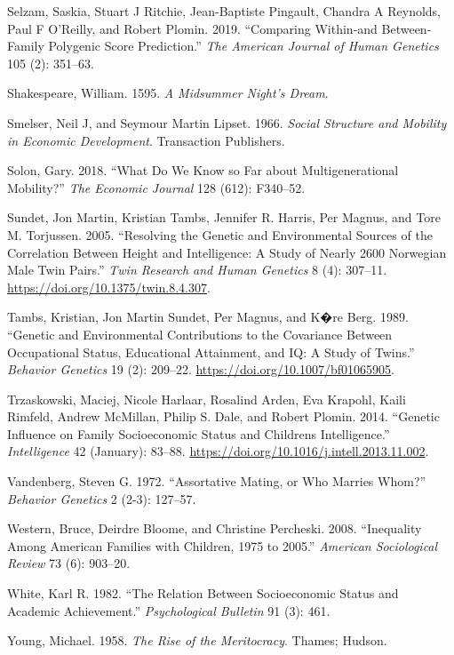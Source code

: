 \documentclass[
]{article}
\newlength{\cslhangindent}
\newlength{\cslentryspacingunit} %
\newenvironment{CSLReferences}[2] %
 {%
  \setlength{\parindent}{0pt}
  \ifodd #1
  \let\oldpar\par
  \def\par{\hangindent=\cslhangindent\oldpar}
  \fi
  \setlength{\parskip}{#2\cslentryspacingunit}
 }%
 {}
\theoremstyle{definition}
\theoremstyle{definition}
\theoremstyle{definition}
\theoremstyle{definition}
\theoremstyle{remark}
\begin{document}
\begin{CSLReferences}{1}{0}
\leavevmode{}%
Selzam, Saskia, Stuart J Ritchie, Jean-Baptiste Pingault, Chandra A Reynolds, Paul F O'Reilly, and Robert Plomin. 2019. {``Comparing Within-and Between-Family Polygenic Score Prediction.''} \emph{The American Journal of Human Genetics} 105 (2): 351--63.

\leavevmode{}%
Shakespeare, William. 1595. \emph{A Midsummer Night's Dream}.

\leavevmode{}%
Smelser, Neil J, and Seymour Martin Lipset. 1966. \emph{Social Structure and Mobility in Economic Development}. Transaction Publishers.

\leavevmode{}%
Solon, Gary. 2018. {``What Do We Know so Far about Multigenerational Mobility?''} \emph{The Economic Journal} 128 (612): F340--52.

\leavevmode{}%
Sundet, Jon Martin, Kristian Tambs, Jennifer R. Harris, Per Magnus, and Tore M. Torjussen. 2005. {``Resolving the Genetic and Environmental Sources of the Correlation Between Height and Intelligence: A Study of Nearly 2600 Norwegian Male Twin Pairs.''} \emph{Twin Research and Human Genetics} 8 (4): 307--11. \url{https://doi.org/10.1375/twin.8.4.307}.

\leavevmode{}%
Tambs, Kristian, Jon Martin Sundet, Per Magnus, and K�re Berg. 1989. {``Genetic and Environmental Contributions to the Covariance Between Occupational Status, Educational Attainment, and {IQ}: A Study of Twins.''} \emph{Behavior Genetics} 19 (2): 209--22. \url{https://doi.org/10.1007/bf01065905}.

\leavevmode{}%
Trzaskowski, Maciej, Nicole Harlaar, Rosalind Arden, Eva Krapohl, Kaili Rimfeld, Andrew McMillan, Philip S. Dale, and Robert Plomin. 2014. {``Genetic Influence on Family Socioeconomic Status and Children{\textquotesingle}s Intelligence.''} \emph{Intelligence} 42 (January): 83--88. \url{https://doi.org/10.1016/j.intell.2013.11.002}.

\leavevmode{}%
Vandenberg, Steven G. 1972. {``Assortative Mating, or Who Marries Whom?''} \emph{Behavior Genetics} 2 (2-3): 127--57.

\leavevmode{}%
Western, Bruce, Deirdre Bloome, and Christine Percheski. 2008. {``Inequality Among American Families with Children, 1975 to 2005.''} \emph{American Sociological Review} 73 (6): 903--20.

\leavevmode{}%
White, Karl R. 1982. {``The Relation Between Socioeconomic Status and Academic Achievement.''} \emph{Psychological Bulletin} 91 (3): 461.

\leavevmode{}%
Young, Michael. 1958. \emph{The Rise of the Meritocracy}. Thames; Hudson.

\end{CSLReferences}
\end{document}
